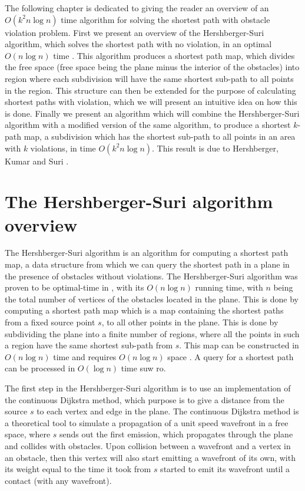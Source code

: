 The following chapter is dedicated to giving the reader an overview of an $O(k^2 n \log n)$ 
time algorithm for solving the shortest path with obstacle violation problem. First we present an 
overview of the Hershberger-Suri algorithm, which solves the shortest path with no violation, 
in an optimal $O(n \log n)$ time \cite{HershbergerS99}. This algorithm produces a shortest 
path map, which divides the free space (free space being the plane minus the interior of the 
obstacles) into region where each subdivision will have the same shortest sub-path to 
all points in the region. This structure can then be extended for the purpose of calculating 
shortest paths with violation, which we will present an intuitive idea on how this is done. 
Finally we present an algorithm which will combine the Hershberger-Suri algorithm with a 
modified version of the same algorithm, to produce a shortest $k$-path map, a subdivision 
which has the shortest sub-path to all points in an area with $k$ violations, in time $O(k^2 
n \log n)$. This result is due to Hershberger, Kumar and Suri \cite{HershbergerKS17}.

\section{The Hershberger-Suri algorithm overview}

The Hershberger-Suri algorithm is an algorithm for computing a shortest path map, a
data structure from which we can query the shortest path in a plane in the presence of 
obstacles without violations. The Hershberger-Suri algorithm was proven to be optimal-time 
in \cite{HershbergerS99}, with its $O(n \log n)$ running time, with $n$ being the total number of vertices 
of the obstacles located in the plane. This is done by computing a shortest path map 
which is  a map containing the shortest paths from a fixed source point $s$, to all 
other points in the plane. This is done by subdividing the plane into a finite number
of regions, where all the points in such a region have the same shortest sub-path
from $s$. This map can be constructed in $O(n\log n)$ time and requires $O(n\log n)$ 
space \cite{HershbergerS99}. A query for a shortest path can be processed in $O(\log n)$
time suw ro\cite{DBLP:journals/siamcomp/Kirkpatrick83}. 

The first step in the Hershberger-Suri algorithm is to use an implementation of
the continuous Dijkstra method, which purpose is to give a distance from the
source $s$ to each vertex and edge in the plane. The continuous Dijkstra method
is a theoretical tool to simulate a propagation of a unit speed wavefront in a
free space, where $s$ sends out the first emission, which propagates through
the plane and collides with obstacles. Upon collision between a wavefront and
a vertex in an obstacle, then this vertex will also start emitting a wavefront
of its own, with its weight equal to the time it took from $s$ started to emit
its wavefront until a contact (with any wavefront). 

